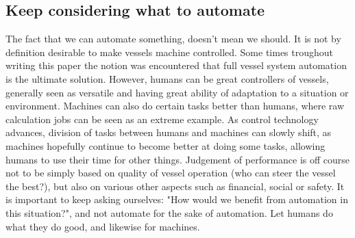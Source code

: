 \subsection*{Keep considering what to automate}
The fact that we can automate something, doesn't mean we should. It is not by definition desirable to make vessels machine controlled. Some times troughout writing this paper the notion was encountered that full vessel system automation is the ultimate solution. However, humans can be great controllers of vessels, generally seen as versatile and having great ability of adaptation to a situation or environment. Machines can also do certain tasks better than humans, where raw calculation jobs can be seen as an extreme example. As control technology advances, division of tasks between humans and machines can slowly shift, as machines hopefully continue to become better at doing some tasks, allowing humans to use their time for other things. Judgement of performance is off course not to be simply based on quality of vessel operation (who can steer the vessel the best?), but also on various other aspects such as financial, social or safety. It is important to keep asking ourselves: "How would we benefit from automation in this situation?", and not automate for the sake of automation. Let humans do what they do good, and likewise for machines.
